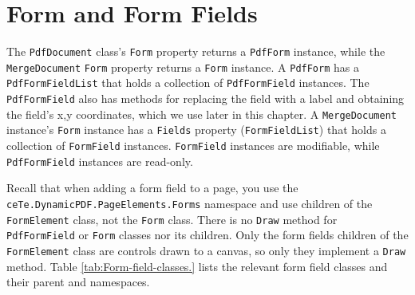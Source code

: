 \documentclass[american]{tufte-book}
\numberwithin{equation}{section}
\numberwithin{figure}{section}
\begin{document}
{{\section{Form and Form Fields}

The \texttt{PdfDocument} class's \texttt{Form} property returns a
\texttt{PdfForm} instance, while the \texttt{MergeDocument} \texttt{Form}
property returns a \texttt{Form} instance.  A \texttt{PdfForm} has
a \texttt{PdfFormFieldList} that holds a collection of \texttt{PdfFormField}
instances. The \texttt{PdfFormField} also has methods for replacing
the field with a label and obtaining the field's x,y coordinates,
which we use later in this chapter. A \texttt{MergeDocument} instance's
\texttt{Form} instance has a \texttt{Fields} property (\texttt{FormFieldList})
that holds a collection of \texttt{FormField} instances. \texttt{FormField}
instances are modifiable, while \texttt{PdfFormField} instances are
read-only.

Recall that when adding a form field to a page, you use the\linebreak
 \texttt{ceTe.DynamicPDF.PageElements.Forms} namespace 
and use children of the \texttt{FormElement} class, not
the \texttt{Form} class. There is no \texttt{Draw} method for \texttt{PdfFormField}
or \texttt{Form} classes nor its children. Only the form fields children
of the \texttt{FormElement} class are controls drawn to a canvas,
so only they implement a \texttt{Draw} method. Table \ref{tab:Form-field-classes.}
lists the relevant form field classes and their parent and namespaces.

\begin{table}


\end{table}}}
\end{document}
